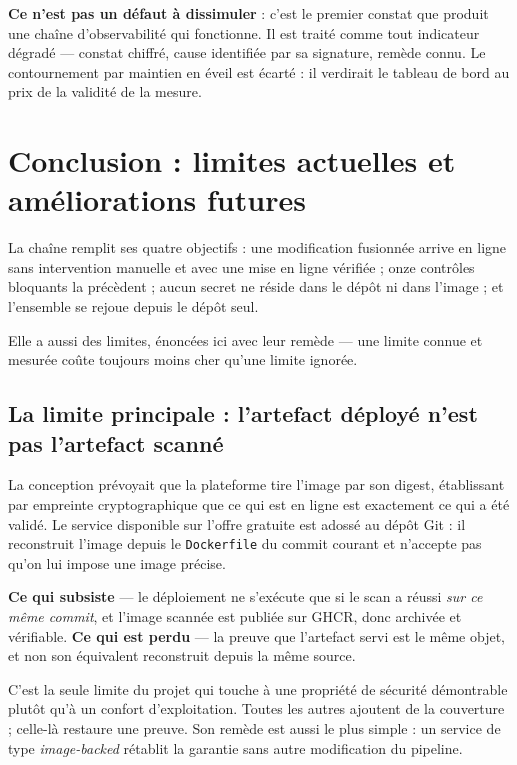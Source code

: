 \documentclass[11pt,a4paper]{article}
\begin{document}
\textbf{Ce n'est pas un défaut à dissimuler} : c'est le premier constat que
produit une chaîne d'observabilité qui fonctionne. Il est traité comme tout
indicateur dégradé — constat chiffré, cause identifiée par sa signature,
remède connu. Le contournement par maintien en éveil est écarté : il
verdirait le tableau de bord au prix de la validité de la mesure.

\section{Conclusion : limites actuelles et améliorations futures}

La chaîne remplit ses quatre objectifs : une modification fusionnée arrive
en ligne sans intervention manuelle et avec une mise en ligne vérifiée ;
onze contrôles bloquants la précèdent ; aucun secret ne réside dans le dépôt
ni dans l'image ; et l'ensemble se rejoue depuis le dépôt seul.

Elle a aussi des limites, énoncées ici avec leur remède — une limite connue
et mesurée coûte toujours moins cher qu'une limite ignorée.

\subsection{La limite principale : l'artefact déployé n'est pas l'artefact scanné}

La conception prévoyait que la plateforme tire l'image par son digest,
établissant par empreinte cryptographique que ce qui est en ligne est
exactement ce qui a été validé. Le service disponible sur l'offre gratuite
est adossé au dépôt Git : il reconstruit l'image depuis le
\texttt{Dockerfile} du commit courant et n'accepte pas qu'on lui impose une
image précise.

\textbf{Ce qui subsiste} — le déploiement ne s'exécute que si le scan a
réussi \emph{sur ce même commit}, et l'image scannée est publiée sur GHCR,
donc archivée et vérifiable. \textbf{Ce qui est perdu} — la preuve que
l'artefact servi est le même objet, et non son équivalent reconstruit depuis
la même source.

C'est la seule limite du projet qui touche à une propriété de sécurité
démontrable plutôt qu'à un confort d'exploitation. Toutes les autres
ajoutent de la couverture ; celle-là restaure une preuve. Son remède est
aussi le plus simple : un service de type \textit{image-backed} rétablit la
garantie sans autre modification du pipeline.
\end{document}
